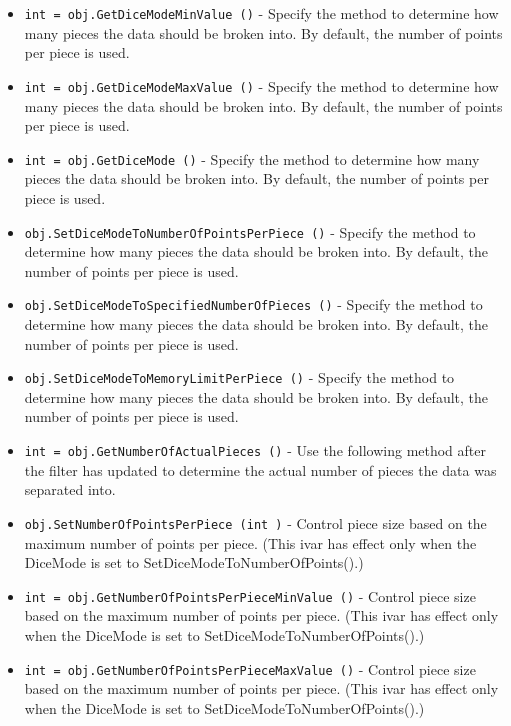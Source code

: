 \begin{itemize}
\item  \verb|int = obj.GetDiceModeMinValue ()| -  Specify the method to determine how many pieces the data should be
 broken into. By default, the number of points per piece is used.

\item  \verb|int = obj.GetDiceModeMaxValue ()| -  Specify the method to determine how many pieces the data should be
 broken into. By default, the number of points per piece is used.

\item  \verb|int = obj.GetDiceMode ()| -  Specify the method to determine how many pieces the data should be
 broken into. By default, the number of points per piece is used.

\item  \verb|obj.SetDiceModeToNumberOfPointsPerPiece ()| -  Specify the method to determine how many pieces the data should be
 broken into. By default, the number of points per piece is used.

\item  \verb|obj.SetDiceModeToSpecifiedNumberOfPieces ()| -  Specify the method to determine how many pieces the data should be
 broken into. By default, the number of points per piece is used.

\item  \verb|obj.SetDiceModeToMemoryLimitPerPiece ()| -  Specify the method to determine how many pieces the data should be
 broken into. By default, the number of points per piece is used.

\item  \verb|int = obj.GetNumberOfActualPieces ()| -  Use the following method after the filter has updated to
 determine the actual number of pieces the data was separated
 into.

\item  \verb|obj.SetNumberOfPointsPerPiece (int )| -  Control piece size based on the maximum number of points per piece.
 (This ivar has effect only when the DiceMode is set to 
 SetDiceModeToNumberOfPoints().)

\item  \verb|int = obj.GetNumberOfPointsPerPieceMinValue ()| -  Control piece size based on the maximum number of points per piece.
 (This ivar has effect only when the DiceMode is set to 
 SetDiceModeToNumberOfPoints().)

\item  \verb|int = obj.GetNumberOfPointsPerPieceMaxValue ()| -  Control piece size based on the maximum number of points per piece.
 (This ivar has effect only when the DiceMode is set to 
 SetDiceModeToNumberOfPoints().)


\end{itemize}
